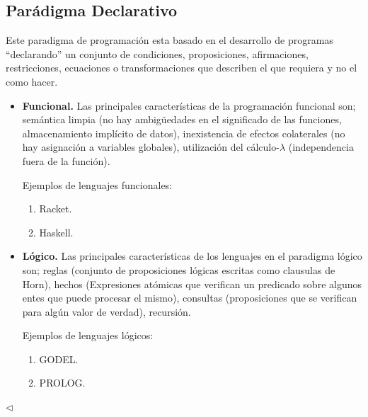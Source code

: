 \subsection*{Parádigma Declarativo}
Este paradigma de programación esta basado en el desarrollo de
programas ``declarando'' un conjunto de condiciones, proposiciones,
afirmaciones, restricciones, ecuaciones o transformaciones que
describen el que requiera y no el como hacer.

\begin{itemize}
\item \textbf{Funcional.}
Las principales características de la programación funcional
son; semántica limpia (no hay ambigüedades en el significado
de las funciones, almacenamiento implícito de datos),
inexistencia de efectos colaterales (no hay asignación a
variables globales), utilización del cálculo-$\lambda$ (independencia
fuera de la función).

Ejemplos de lenguajes funcionales:
\begin{enumerate}
\item Racket.
\item Haskell.
\end{enumerate}
\item \textbf{Lógico.}
Las principales características de los lenguajes en el paradigma lógico
son; reglas (conjunto de proposiciones lógicas escritas como clausulas
de Horn), hechos (Expresiones atómicas que verifican un predicado sobre
algunos entes que puede procesar el mismo), consultas (proposiciones
que se verifican para algún valor de verdad), recursión.

Ejemplos de lenguajes lógicos:
\begin{enumerate}
\item GODEL.
\item PROLOG.
\end{enumerate}
\end{itemize}
\hfill $\lhd$
